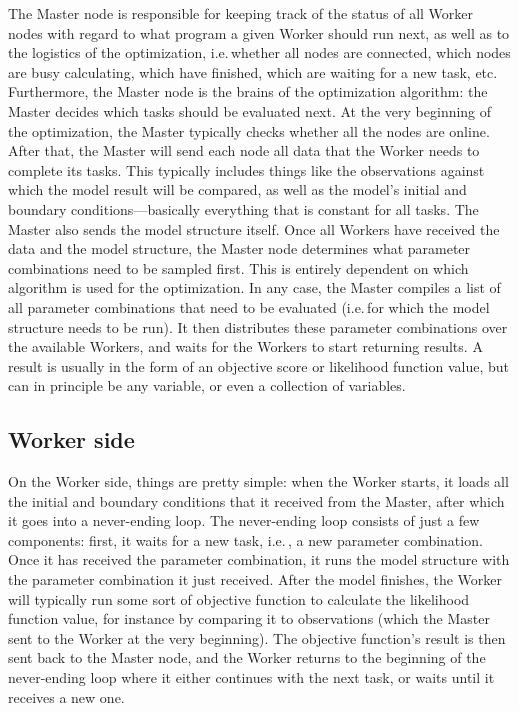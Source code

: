 The Master node is responsible for keeping track of the status of all Worker nodes with regard to what program a given Worker should run next, as well as to the logistics of the optimization, i.e.\,whether all nodes are connected, which nodes are busy calculating, which have finished, which are waiting for a new task, etc. Furthermore, the Master node is the brains of the optimization algorithm: the Master decides which tasks should be evaluated next. At the very beginning of the optimization, the Master typically checks whether all the nodes are online. After that, the Master will send each node all data that the Worker needs to complete its tasks. This typically includes things like the observations against which the model result will be compared, as well as the model's initial and boundary conditions---basically everything that is constant for all tasks. The Master also sends the model structure itself. Once all Workers have received the data and the model structure, the Master node determines what parameter combinations need to be sampled first. This is entirely dependent on which algorithm is used for the optimization. In any case, the Master compiles a list of all parameter combinations that need to be evaluated (i.e.\,for which the model structure needs to be run). It then distributes these parameter combinations over the available Workers, and waits for the Workers to start returning results. A result is usually in the form of an objective score or likelihood function value, but can in principle be any variable, or even a collection of variables.

\subsection{Worker side}


On the Worker side, things are pretty simple: when the Worker starts, it loads all the initial and boundary conditions that it received from the Master, after which it goes into a never-ending loop. The never-ending loop consists of just a few components: first, it waits for a new task, i.e.\,, a new parameter combination. Once it has received the parameter combination, it runs the model structure with the parameter combination it just received. After the model finishes, the Worker will typically run some sort of objective function to calculate the likelihood function value, for instance by comparing it to observations (which the Master sent to the Worker at the very beginning). The objective function's result is then sent back to the Master node, and the Worker returns to the beginning of the never-ending loop where it either continues with the next task, or waits until it receives a new one. 




